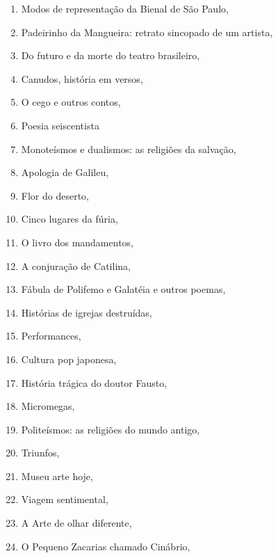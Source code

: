 \begin{multicols}{2}
\begin{enumerate}
\item Modos de representação da Bienal de São Paulo, {}
\item Padeirinho da Mangueira: retrato sincopado de um artista, {}
\item Do futuro e da morte do teatro brasileiro, {}
\item Canudos, história em versos, {}
\item O cego e outros contos, {}
\item Poesia seiscentista
\item Monoteísmos e dualismos: as religiões da salvação, {}
\item Apologia de Galileu, {}
\item Flor do deserto, {}
\item Cinco lugares da fúria, {}
\item O livro dos mandamentos, {}
\item A conjuração de Catilina, {}
\item Fábula de Polifemo e Galatéia e outros poemas, {}
\item Histórias de igrejas destruídas, {}
\item Performances, {}
\item Cultura pop japonesa, {}
\item História trágica do doutor Fausto, {}
\item Micromegas, {}
\item Politeísmos: as religiões do mundo antigo, {}
\item Triunfos, {}
\item Museu arte hoje, {}
\item Viagem sentimental, {}
\item A Arte de olhar diferente, {}
\item O Pequeno Zacarias chamado Cinábrio, {}

\end{enumerate}
\end{multicols}
